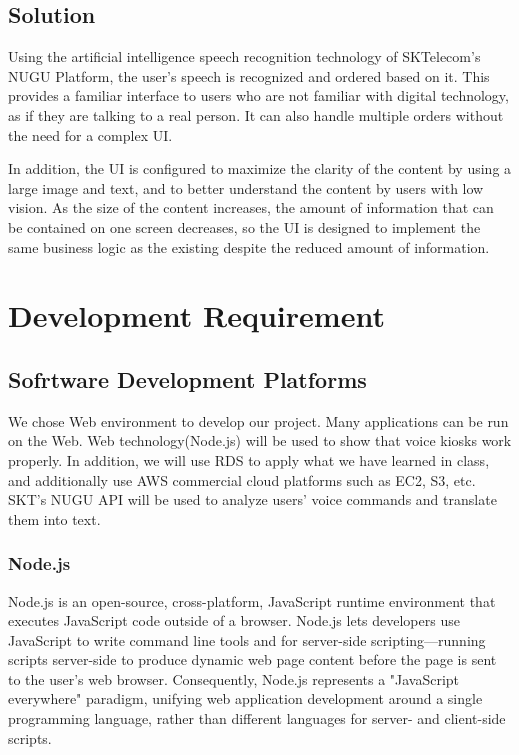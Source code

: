 \documentclass[conference,compsoc]{IEEEtran}
\begin{document}
\subsection{Solution}
Using the artificial intelligence speech recognition technology of SKTelecom's NUGU Platform, the user's speech is recognized and ordered based on it. This provides a familiar interface to users who are not familiar with digital technology, as if they are talking to a real person. It can also handle multiple orders without the need for a complex UI.

In addition, the UI is configured to maximize the clarity of the content by using a large image and text, and to better understand the content by users with low vision. As the size of the content increases, the amount of information that can be contained on one screen decreases, so the UI is designed to implement the same business logic as the existing despite the reduced amount of information.

\section{Development Requirement}

\subsection{Sofrtware Development Platforms}

We chose Web environment to develop our project. Many applications can be run on the Web. Web technology(Node.js) will be used to show that voice kiosks work properly. In addition, we will use RDS to apply what we have learned in class, and additionally use AWS commercial cloud platforms such as EC2, S3, etc. SKT's NUGU API will be used to analyze users' voice commands and translate them into text.

\subsubsection{Node.js}

Node.js is an open-source, cross-platform, JavaScript runtime environment that executes JavaScript code outside of a browser. Node.js lets developers use JavaScript to write command line tools and for server-side scripting—running scripts server-side to produce dynamic web page content before the page is sent to the user's web browser. Consequently, Node.js represents a "JavaScript everywhere" paradigm, unifying web application development around a single programming language, rather than different languages for server- and client-side scripts.
\end{document}
